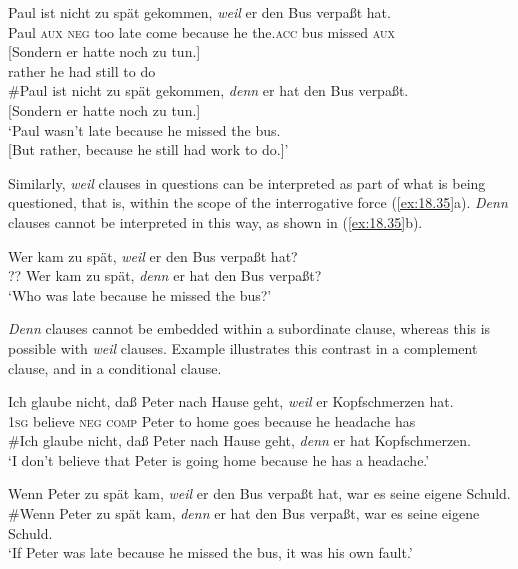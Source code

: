 \ea \label{ex:18.34}
\ea  \gll  Paul  ist  nicht  zu  spät  gekommen,  \textit{weil}  er  den  Bus  verpaßt  hat.\\
Paul  \textsc{aux}  \textsc{neg}  too  late  come  because  he  the.\textsc{acc}  bus  missed  \textsc{aux}\\
\gll   {}[Sondern  er  hatte  noch  zu  tun.]\\
  rather  he  had  still  to  do\\
\ex  \#Paul ist nicht zu spät gekommen, \textit{denn} er hat den Bus verpaßt.\\
  {}[Sondern er hatte noch zu tun.]\\
\glt ‘Paul wasn’t late because he missed the bus.\\
{}[But rather, because he still had work to do.]’
\z \z


Similarly, \textit{weil} clauses in questions can be interpreted as part of what is being questioned, that is, within the scope of the interrogative force (\ref{ex:18.35}a). \textit{Denn} clauses cannot be interpreted in this way, as shown in (\ref{ex:18.35}b).


\ea \label{ex:18.35}
\ea  Wer kam zu spät, \textit{weil} er den Bus verpaßt hat?\\
\ex ?? Wer kam zu spät, \textit{denn} er hat den Bus verpaßt?\\
\glt ‘Who was late because he missed the bus?’
                       \z
\z


\textit{Denn} clauses cannot be embedded within a subordinate clause, whereas this is possible with \textit{weil} clauses. Example  illustrates this contrast in a complement clause, and  in a conditional clause.


\ea \label{ex:18.36}
\ea   \gll Ich  glaube  nicht,  daß  Peter  nach  Hause  geht,  \textit{weil}  er  Kopfschmerzen  hat.\\
\textsc{1sg}  believe  \textsc{neg}  \textsc{comp}  Peter  to  home  goes  because  he  headache  has\\
\ex  \#Ich glaube nicht, daß Peter nach Hause geht, \textit{denn} er hat Kopfschmerzen.\\
\glt ‘I don’t believe that Peter is going home because he has a headache.’
\z \z

\ea \label{ex:18.37}
\ea  Wenn Peter zu spät kam, \textit{weil} er den Bus verpaßt hat, war es seine eigene Schuld.\\
\ex \#Wenn Peter zu spät kam, \textit{denn} er hat den Bus verpaßt, war es seine eigene Schuld.\\
\glt ‘If Peter was late because he missed the bus, it was his own fault.’
\z \z


